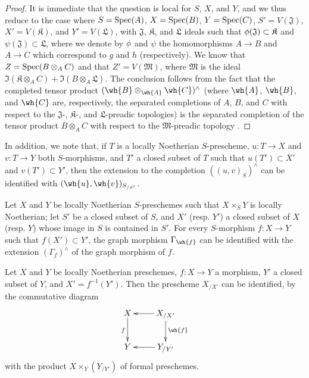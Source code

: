\begin{proof}
\label{proof-1.10.9.7}
It is immediate that the question is local for $S$, $X$, and $Y$, and we thus reduce to the case where $S=\operatorname{Spec}(A)$, $X=\operatorname{Spec}(B)$, $Y=\operatorname{Spec}(C)$, $S'=V(\mathfrak{J})$, $X'=V(\mathfrak{K})$, and $Y'=V(\mathfrak{L})$, with $\mathfrak{J}$, $\mathfrak{K}$, and $\mathfrak{L}$ ideals such that $\phi(\mathfrak{J})\subset\mathfrak{K}$ and $\psi(\mathfrak{J})\subset\mathfrak{L}$, where we denote by $\phi$ and $\psi$ the homomorphisms $A\to B$ and $A\to C$ which correspond to $g$ and $h$ (respectively).
We know that $Z=\operatorname{Spec}(B\otimes_A C)$ and that $Z'=V(\mathfrak{M})$, where $\mathfrak{M}$ is the ideal $\Im(\mathfrak{K}\otimes_A C)+\Im(B\otimes_A\mathfrak{L})$.
The conclusion follows  from the fact that the completed tensor product $(\wh{B}\otimes_\wh{A}\wh{C})^\wedge$ (where $\wh{A}$, $\wh{B}$, and $\wh{C}$ are, respectively, the separated completions of $A$, $B$, and $C$ with respect to the $\mathfrak{J}$-, $\mathfrak{K}$-, and $\mathfrak{L}$-preadic topologies) is the separated completion of the tensor product $B\otimes_A C$ with respect to the $\mathfrak{M}$-preadic topology .
\end{proof}

In addition, we note that, if $T$ is a locally Noetherian $S$-prescheme, $u:T\to X$ and $v:T\to Y$ both $S$-morphisms, and $T'$ a closed subset of $T$ such that $u(T')\subset X'$ and $v(T')\subset Y'$, then the extension to the completion $((u,v)_S)^\wedge$ can be identified with $(\wh{u},\wh{v})_{S_{/S'}}$.

\begin{corollary}[10.9.8]
\label{1.10.9.8}
Let $X$ and $Y$ be locally Noetherian $S$-preschemes such that $X\times_S Y$ is locally Noetherian; let $S'$ be a closed subset of $S$, and $X'$ (resp. $Y'$) a closed subset of $X$ (resp. $Y$) whose image in $S$ is contained in $S'$.
For every $S$-morphism $f:X\to Y$ such that $f(X')\subset Y'$, the graph morphism $\Gamma_\wh{f}$ can be identified with the extension $(\Gamma_f)^\wedge$ of the graph morphism of $f$.
\end{corollary}

\begin{corollary}[10.9.9]
\label{1.10.9.9}
Let $X$ and $Y$ be locally Noetherian preschemes, $f:X\to Y$ a morphism, $Y'$ a closed subset of $Y$, and $X'=f^{-1}(Y')$.
Then the prescheme $X_{/X'}$ can be identified, by the commutative diagram
\[
  \xymatrix{
    X\ar[d]_f &
    X_{/X'}\ar[l]\ar[d]^{\wh{f}}\\
    Y &
    Y_{/Y'}\ar[l]
  }
\]
with the product $X\times_Y(Y_{/Y'})$ of formal preschemes.
\end{corollary}

